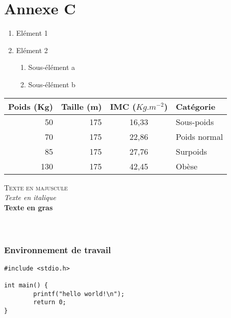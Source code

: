 \documentclass{article}
\begin{document}
\part{Annexe C}

\begin{enumerate}                                           
  \item Elément 1                                         
  \item Elément 2                                        
  \begin{enumerate}                                     
    \item Sous-élément a                               
    \item Sous-élément b                                  
  \end{enumerate}                                   
\end{enumerate}

\begin{tabular}{|r|r||c|l|}                                      
\hline                                              
Poids (Kg) & Taille (m) & IMC ($Kg.m^{-2}$) & Catégorie \\                                    
\hline                                           
 50 & 175 & 16,33 & Sous-poids \\                            
 70 & 175 & 22,86 & Poids normal \\                          
 85 & 175 & 27,76 & Surpoids \\                       
130 & 175 & 42,45 & Obèse \\                                  
\hline                                      
\end{tabular}                                  
\newpage

\textsc{Texte en majuscule} \\      
\textit{Texte en italique} \\         
\textbf{Texte en gras} \\        
 \\      
 \\


\section{Environnement de travail}


\begin{scriptsize}       
\begin{verbatim}           
#include <stdio.h>     
          
int main() {             
        printf("hello world!\n");   
        return 0;              
}                     
\end{verbatim}               
\end{scriptsize}


\end{document}

